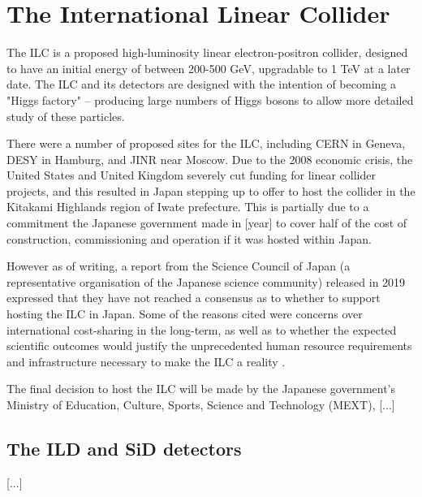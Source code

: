 
\section{The International Linear Collider}

The \acrfull{ILC} is a proposed high-luminosity linear electron-positron collider, designed to have an initial energy of between 200-500 GeV, upgradable to 1 TeV at a later date. The ILC and its detectors are designed with the intention of becoming a "Higgs factory" -- producing large numbers of Higgs bosons to allow more detailed study of these particles.

There were a number of proposed sites for the ILC, including CERN in Geneva, DESY in Hamburg, and \acrshort{JINR} near Moscow. Due to the 2008 economic crisis, the United States and United Kingdom severely cut funding for linear collider projects, and this resulted in Japan stepping up to offer to host the collider in the Kitakami Highlands region of Iwate prefecture. This is partially due to a commitment the Japanese government made in [year] to cover half of the cost of construction, commissioning and operation if it was hosted within Japan.

However as of writing, a report from the Science Council of Japan (a representative organisation of the Japanese science community) released in 2019 expressed that they have not reached a consensus as to whether to support hosting the ILC in Japan. Some  of the reasons cited were concerns over international cost-sharing in the long-term, as well as to whether the expected scientific outcomes would justify the unprecedented human resource requirements and infrastructure necessary to make the ILC a reality \cite{linearcolliders-scj-report}.

The final decision to host the ILC will be made by the Japanese government's Ministry of Education, Culture, Sports, Science and Technology (MEXT), [...]

\subsection{The ILD and SiD detectors}
[...]

